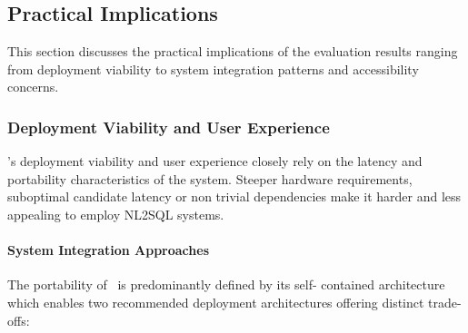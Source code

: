 \subsection{Practical Implications}

This section discusses the practical implications of the evaluation results
ranging from deployment viability to system integration patterns and
accessibility concerns.

\subsubsection{Deployment Viability and User Experience}

\Natural's deployment viability and user experience closely rely on the latency
and portability characteristics of the system. Steeper hardware requirements,
suboptimal candidate latency or non trivial dependencies make it harder and
less appealing to employ NL2SQL systems.

\paragraph{System Integration Approaches}

The portability of \Natural~is predominantly defined by its self- contained
architecture which enables two recommended deployment architectures offering
distinct trade-offs:

